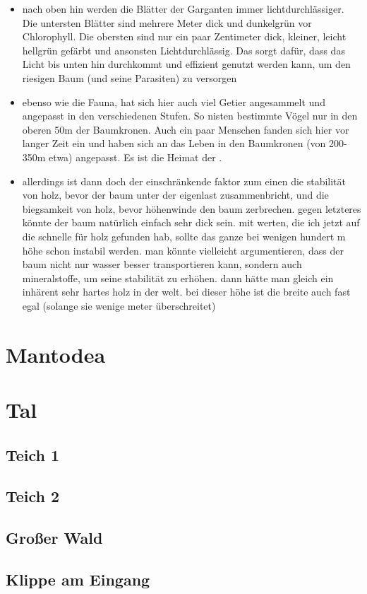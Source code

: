\begin{itemize}
	\item nach oben hin werden die Blätter der Garganten immer lichtdurchlässiger. Die untersten Blätter sind mehrere Meter dick und dunkelgrün vor Chlorophyll. Die obersten sind nur ein paar Zentimeter dick, kleiner, leicht hellgrün gefärbt und ansonsten Lichtdurchlässig. Das sorgt dafür, dass das Licht bis unten hin durchkommt und effizient genutzt werden kann, um den riesigen Baum (und seine Parasiten) zu versorgen
	\item ebenso wie die Fauna, hat sich hier auch viel Getier angesammelt und angepasst in den verschiedenen Stufen. So nisten bestimmte Vögel nur in den oberen 50m der Baumkronen. Auch ein paar Menschen fanden sich hier vor langer Zeit ein und haben sich an das Leben in den Baumkronen (von 200-350m etwa) angepasst. Es ist die Heimat der .
	\item allerdings ist dann doch der einschränkende faktor zum einen die stabilität von holz, bevor der baum unter der eigenlast zusammenbricht, und die biegsamkeit von holz, bevor höhenwinde den baum zerbrechen. gegen letzteres könnte der baum natürlich einfach sehr dick sein. mit werten, die ich jetzt auf die schnelle für holz gefunden hab, sollte das ganze bei wenigen hundert m höhe schon instabil werden. man könnte vielleicht argumentieren, dass der baum nicht nur wasser besser transportieren kann, sondern auch mineralstoffe, um seine stabilität zu erhöhen. dann hätte man gleich ein inhärent sehr hartes holz in der welt. bei dieser höhe ist die breite auch fast egal (solange sie wenige meter überschreitet)
\end{itemize}

\section{Mantodea} \label{sec:land}
\section{Tal}
\subsection{Teich 1}
\subsection{Teich 2}
\subsection{Großer Wald}
\subsection{Klippe am Eingang}


